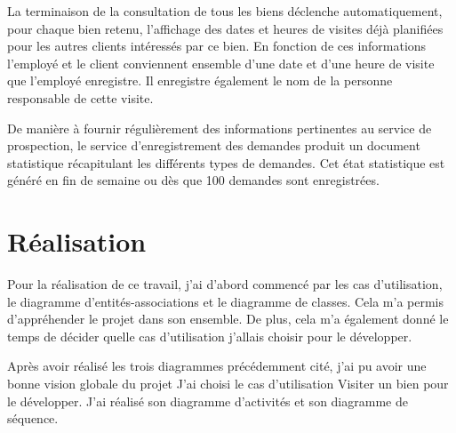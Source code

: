 La terminaison de la consultation de tous les biens déclenche automatiquement, pour chaque bien retenu, l'affichage des dates et heures de visites déjà planifiées pour les autres clients intéressés par ce bien. En fonction de ces informations l'employé et le client conviennent ensemble d'une date et d'une heure de visite que l'employé enregistre. Il enregistre également le nom de la personne responsable de cette visite.

De manière à fournir régulièrement des informations pertinentes au service de prospection, le service d'enregistrement des demandes produit un document statistique récapitulant les différents types de demandes. Cet état statistique est généré en fin de semaine ou dès que 100 demandes sont enregistrées.

\section{Réalisation}

Pour la réalisation de ce travail, j'ai d'abord commencé par les cas d'utilisation, le diagramme d'entités-associations et le diagramme de classes. Cela m'a permis d'appréhender le projet dans son ensemble. De plus, cela m'a également donné le temps de décider quelle cas d'utilisation j'allais choisir pour le développer.

Après avoir réalisé les trois diagrammes précédemment cité, j'ai pu avoir une bonne vision globale du projet J'ai choisi le cas d'utilisation \og{}Visiter un bien\fg{} pour le développer. J'ai réalisé son diagramme d'activités et son diagramme de séquence.